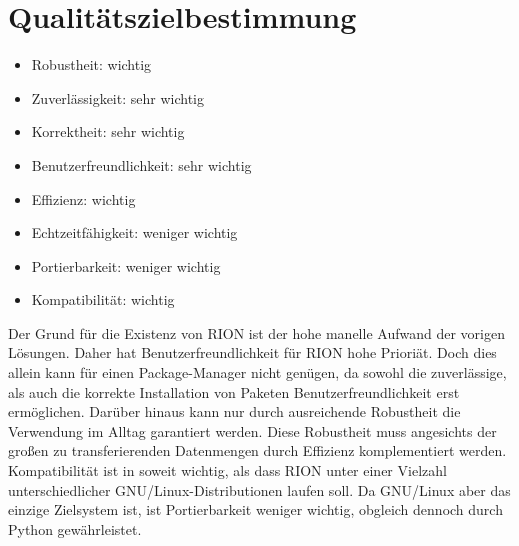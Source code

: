 \chapter{Qualitätszielbestimmung}

\begin{itemize}
	\item Robustheit: wichtig
	\item Zuverlässigkeit: sehr wichtig
	\item Korrektheit: sehr wichtig
	\item Benutzerfreundlichkeit: sehr wichtig
	\item Effizienz: wichtig
	\item Echtzeitfähigkeit: weniger wichtig
	\item Portierbarkeit: weniger wichtig
	\item Kompatibilität: wichtig
\end{itemize}

Der Grund für die Existenz von RION ist der hohe manelle Aufwand der vorigen Lösungen.
Daher hat Benutzerfreundlichkeit für RION hohe Prioriät.
Doch dies allein kann für einen Package-Manager nicht genügen, da sowohl die zuverlässige, als auch die korrekte Installation von Paketen Benutzerfreundlichkeit erst ermöglichen. Darüber hinaus kann nur durch ausreichende Robustheit die Verwendung im Alltag garantiert werden. Diese Robustheit muss angesichts der großen zu transferierenden Datenmengen durch Effizienz komplementiert werden.
Kompatibilität ist in soweit wichtig, als dass RION unter einer Vielzahl unterschiedlicher GNU/Linux-Distributionen laufen soll. Da GNU/Linux aber das einzige Zielsystem ist, ist Portierbarkeit weniger wichtig, obgleich dennoch durch Python gewährleistet.
 